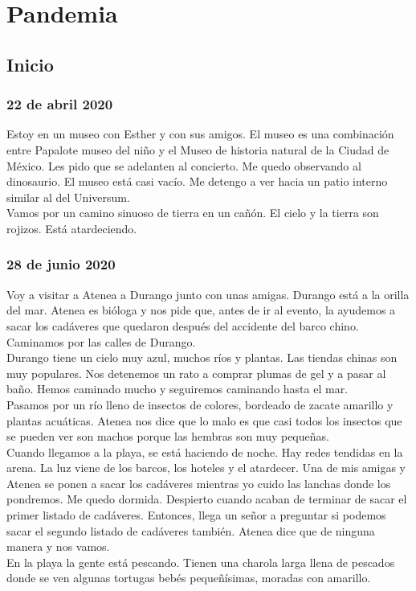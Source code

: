 \documentclass[12pt]{book}
\begin{document}
\chapter{Pandemia}

\section{Inicio}

\subsection*{\hfill 22 de abril 2020}

Estoy en un museo con Esther y con sus amigos. El museo es una combinación entre Papalote museo del niño y el Museo de historia natural de la Ciudad de México. Les pido que se adelanten al concierto. Me quedo observando al dinosaurio. El museo está casi vacío. Me detengo a ver hacia un patio interno similar al del Universum.\\
Vamos por un camino sinuoso de tierra en un cañón. El cielo y la tierra son rojizos. Está atardeciendo.

\subsection*{\hfill 28 de junio 2020}
Voy a visitar a Atenea a Durango junto con unas amigas. Durango está a la orilla del mar. 
Atenea es bióloga y nos pide que, antes de ir al evento, 
la ayudemos a sacar los cadáveres que quedaron después del accidente del barco chino. 
Caminamos por las calles de Durango. 
\\
Durango tiene un cielo muy azul, muchos ríos y plantas. Las tiendas chinas son muy populares. 
Nos detenemos un rato a comprar plumas de gel y a pasar al baño.  
Hemos caminado mucho y seguiremos caminando hasta el mar.
\\
Pasamos por un río lleno de insectos de colores,
 bordeado de zacate amarillo y plantas acuáticas. 
 Atenea nos dice que lo malo es que casi todos los insectos 
 que se pueden ver son machos porque las hembras son muy pequeñas. 
 \\
Cuando llegamos a la playa, se está haciendo de noche. Hay redes tendidas en la arena. La luz viene de los barcos, los hoteles y el atardecer. Una de mis amigas y Atenea se ponen a sacar los cadáveres mientras yo cuido las lanchas donde los pondremos. Me quedo dormida. Despierto cuando acaban de terminar de sacar el primer listado de cadáveres. Entonces, llega un señor a preguntar si podemos sacar el segundo listado de cadáveres también. Atenea dice que de ninguna manera y nos vamos. \\
En la playa la gente está pescando. Tienen una charola larga llena de pescados donde se ven algunas tortugas bebés pequeñísimas, moradas con amarillo.
\end{document}
